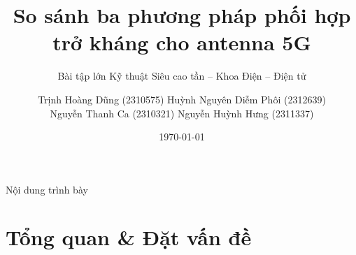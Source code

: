 \documentclass[aspectratio=169,10pt]{beamer}
\title[Phối hợp trở kháng antenna 5G]{So sánh ba phương pháp phối hợp trở kháng cho antenna 5G}
\subtitle{Bài tập lớn Kỹ thuật Siêu cao tần -- Khoa Điện -- Điện tử}
\author[Tổ 8 -- Nhóm L04]{%
  Trịnh Hoàng Dũng (2310575) \quad\textbar\quad Huỳnh Nguyên Diễm Phôi (2312639)\\
  Nguyễn Thanh Ca (2310321) \quad\textbar\quad Nguyễn Huỳnh Hưng (2311337)}
\institute[KTSCT -- L04]{Tổ 8 -- Nhóm L04 \quad\textbar\quad GVHD: TS. Nguyễn Minh Tân}
\date{\today}
\begin{document}
\begin{frame}
  \titlepage
\end{frame}

\begin{frame}{Nội dung trình bày}
  \tableofcontents
\end{frame}

\section{Tổng quan \& Đặt vấn đề}
\end{document}
